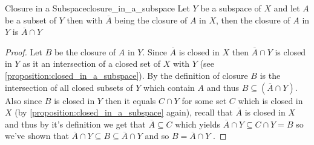 \begin{proposition}{Closure in a Subspace}{closure_in_a_subspace}
Let \( Y \) be a subspace of \( X \) and let \( A \) be a subset of \( Y \)
then with \( \overline{A}  \) being the closure of \( A \) in \( X \), then the
closure of \( A \)  in \( Y \) is \( \overline{A}  \cap Y \) 
\end{proposition}
\begin{proof}
    Let \( B \) be the closure of \( A \) in \( Y \). Since \( \overline{A}  \)
    is closed in \( X \) then \( \overline{A} \cap Y \) is closed in \( Y \) as
    it an intersection of a closed set of \( X \) with \( Y \) (see
    \ref{proposition:closed_in_a_subspace}). By the definition of closure \( B
    \) is the intersection of all closed subsets of \( Y \) which contain \( A
    \) and thus \( B \subseteq \left( \overline{A} \cap Y \right)  \). Also
    since \( B \) is closed in \( Y \) then it equals \( C \cap  Y \) for some
    set \( C \) which is closed in \( X \) (by
    \ref{proposition:closed_in_a_subspace} again), recall that \( \overline{A}
    \) is closed in \( X \) and thus by it's definition we get that \(
    \overline{A} \subseteq C \) which yields \( \overline{A} \cap Y \subseteq C
    \cap Y = B\) so we've shown that \( \overline{A} \cap Y \subseteq B
    \subseteq \overline{A} \cap Y\) and so \( B = \overline{A} \cap Y \) .
\end{proof}
